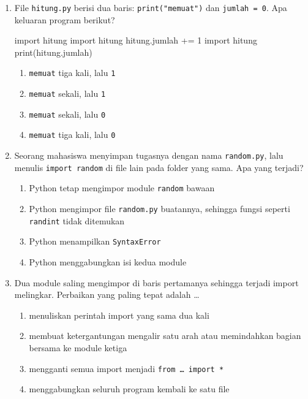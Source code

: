 \begin{enumerate}
  \item File \texttt{hitung.py} berisi dua baris: \texttt{print("memuat")} dan \texttt{jumlah = 0}. Apa keluaran program berikut?
\begin{kode}[Soal 8]
import hitung
import hitung
hitung.jumlah += 1
import hitung
print(hitung.jumlah)
\end{kode}
  \begin{enumerate}[label=\alph*.,itemsep=0pt]
    \item \texttt{memuat} tiga kali, lalu \texttt{1}
    \item \texttt{memuat} sekali, lalu \texttt{1}
    \item \texttt{memuat} sekali, lalu \texttt{0}
    \item \texttt{memuat} tiga kali, lalu \texttt{0}
  \end{enumerate}

  \item Seorang mahasiswa menyimpan tugasnya dengan nama \texttt{random.py}, lalu menulis \texttt{import random} di file lain pada folder yang sama. Apa yang terjadi?
  \begin{enumerate}[label=\alph*.,itemsep=0pt]
    \item Python tetap mengimpor module \texttt{random} bawaan
    \item Python mengimpor file \texttt{random.py} buatannya, sehingga fungsi seperti \texttt{randint} tidak ditemukan
    \item Python menampilkan \texttt{SyntaxError}
    \item Python menggabungkan isi kedua module
  \end{enumerate}

  \item Dua module saling mengimpor di baris pertamanya sehingga terjadi import melingkar. Perbaikan yang paling tepat adalah \ldots
  \begin{enumerate}[label=\alph*.,itemsep=0pt]
    \item menuliskan perintah import yang sama dua kali
    \item membuat ketergantungan mengalir satu arah atau memindahkan bagian bersama ke module ketiga
    \item mengganti semua import menjadi \texttt{from \ldots\ import *}
    \item menggabungkan seluruh program kembali ke satu file
  \end{enumerate}
\end{enumerate}

